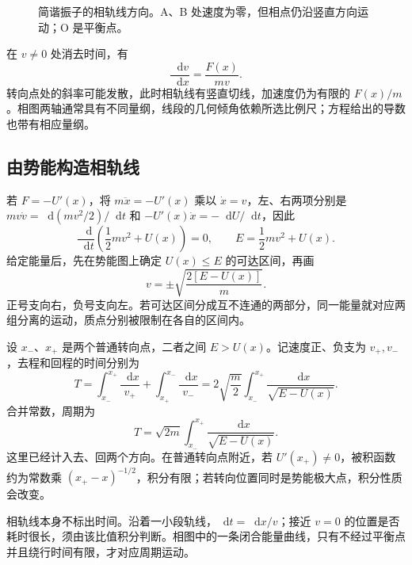 \documentclass[11pt,openany,fontset=fandol]{ctexbook}
\theoremstyle{definition}\newtheorem{example}{例}[chapter]\newtheorem{exercise}{习题}[chapter]
\newcommand{\dd}{\mathop{}\!\mathrm d}\newcommand{\ee}{\mathrm e}\newcommand{\vct}[1]{\bm{#1}}
\begin{document}
\begin{figure}[H]
\caption{简谐振子的相轨线方向。A、B 处速度为零，但相点仍沿竖直方向运动；O 是平衡点。}\label{mp4:fig:l4-field}
\end{figure}


在 $v\ne0$ 处消去时间，有
\[
\frac{\dd v}{\dd x}=\frac{F(x)}{mv}.
\]
转向点处的斜率可能发散，此时相轨线有竖直切线，加速度仍为有限的 $F(x)/m$。相图两轴通常具有不同量纲，线段的几何倾角依赖所选比例尺；方程给出的导数也带有相应量纲。

\subsection{由势能构造相轨线}
若 $F=-U'(x)$，将 $m\ddot x=-U'(x)$ 乘以 $\dot x=v$，左、右两项分别是 $mv\dot v=\dd(mv^2/2)/\dd t$ 和 $-U'(x)\dot x=-\dd U/\dd t$，因此
\begin{equation}\label{mp4:eq:l4-energy}
\frac{\dd}{\dd t}\left(\frac12mv^2+U(x)\right)=0,
\qquad E=\frac12mv^2+U(x).
\end{equation}
给定能量后，先在势能图上确定 $U(x)\le E$ 的可达区间，再画
\begin{equation}\label{mp4:eq:l4-energy-curve}
v=\pm\sqrt{\frac{2[E-U(x)]}{m}}.
\end{equation}
正号支向右，负号支向左。若可达区间分成互不连通的两部分，同一能量就对应两组分离的运动，质点分别被限制在各自的区间内。

设 $x_-$、$x_+$ 是两个普通转向点，二者之间 $E>U(x)$。记速度正、负支为 $v_+,v_-$，去程和回程的时间分别为
\[
T=\int_{x_-}^{x_+}\frac{\dd x}{v_+}
+\int_{x_+}^{x_-}\frac{\dd x}{v_-}
=2\sqrt{\frac m2}\int_{x_-}^{x_+}\frac{\dd x}{\sqrt{E-U(x)}}.
\]
合并常数，周期为
\begin{equation}\label{mp4:eq:l4-period}
T=\sqrt{2m}\int_{x_-}^{x_+}\frac{\dd x}{\sqrt{E-U(x)}}.
\end{equation}
这里已经计入去、回两个方向。在普通转向点附近，若 $U'(x_+)\ne0$，被积函数约为常数乘 $(x_+-x)^{-1/2}$，积分有限；若转向位置同时是势能极大点，积分性质会改变。

相轨线本身不标出时间。沿着一小段轨线，$\dd t=\dd x/v$；接近 $v=0$ 的位置是否耗时很长，须由该比值积分判断。相图中的一条闭合能量曲线，只有不经过平衡点并且绕行时间有限，才对应周期运动。
\end{document}
